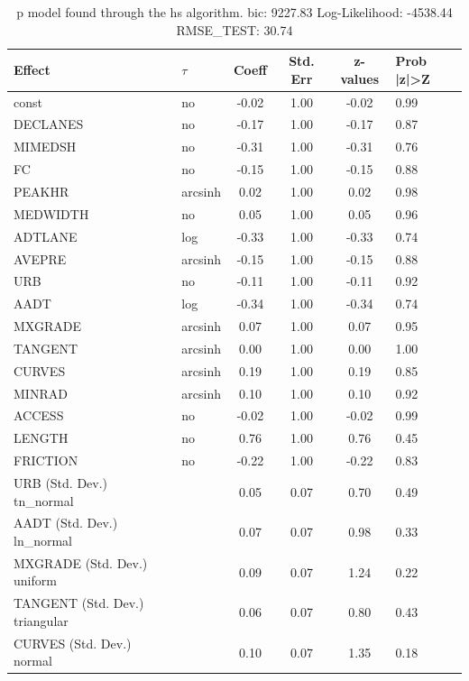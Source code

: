 \begin{table}
	\caption{p model found through the hs algorithm. bic: 9227.83 Log-Likelihood: -4538.44 RMSE_TEST: 30.74}
	\begin{center}
		\begin{tabular}{|l|l|c|c|c|l|}
			\hline
			Effect & $\tau$ & Coeff & Std. Err & z-values & Prob |z|>Z \\
			\hline
			const & no & -0.02 & 1.00 & -0.02 & 0.99 \\
			\hline
			DECLANES & no & -0.17 & 1.00 & -0.17 & 0.87 \\
			\hline
			MIMEDSH & no & -0.31 & 1.00 & -0.31 & 0.76 \\
			\hline
			FC & no & -0.15 & 1.00 & -0.15 & 0.88 \\
			\hline
			PEAKHR & arcsinh & 0.02 & 1.00 & 0.02 & 0.98 \\
			\hline
			MEDWIDTH & no & 0.05 & 1.00 & 0.05 & 0.96 \\
			\hline
			ADTLANE & log & -0.33 & 1.00 & -0.33 & 0.74 \\
			\hline
			AVEPRE & arcsinh & -0.15 & 1.00 & -0.15 & 0.88 \\
			\hline
			URB & no & -0.11 & 1.00 & -0.11 & 0.92 \\
			\hline
			AADT & log & -0.34 & 1.00 & -0.34 & 0.74 \\
			\hline
			MXGRADE & arcsinh & 0.07 & 1.00 & 0.07 & 0.95 \\
			\hline
			TANGENT & arcsinh & 0.00 & 1.00 & 0.00 & 1.00 \\
			\hline
			CURVES & arcsinh & 0.19 & 1.00 & 0.19 & 0.85 \\
			\hline
			MINRAD & arcsinh & 0.10 & 1.00 & 0.10 & 0.92 \\
			\hline
			ACCESS & no & -0.02 & 1.00 & -0.02 & 0.99 \\
			\hline
			LENGTH & no & 0.76 & 1.00 & 0.76 & 0.45 \\
			\hline
			FRICTION & no & -0.22 & 1.00 & -0.22 & 0.83 \\
			\hline
			URB (Std. Dev.) tn_normal &  & 0.05 & 0.07 & 0.70 & 0.49 \\
			\hline
			AADT (Std. Dev.) ln_normal &  & 0.07 & 0.07 & 0.98 & 0.33 \\
			\hline
			MXGRADE (Std. Dev.) uniform &  & 0.09 & 0.07 & 1.24 & 0.22 \\
			\hline
			TANGENT (Std. Dev.) triangular &  & 0.06 & 0.07 & 0.80 & 0.43 \\
			\hline
			CURVES (Std. Dev.) normal &  & 0.10 & 0.07 & 1.35 & 0.18 \\

\end{tabular}
\end{center}
\end{table}

